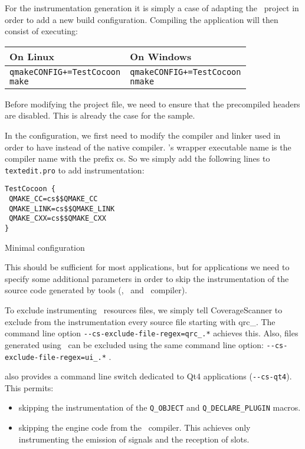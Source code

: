 For the instrumentation generation it is simply a case of adapting the
\qmake\ project in order to add a new build configuration. Compiling the
application will then consist of executing:

\begin{center}
\begin{tabular}{|p{7cm}|p{7cm}|} \hline
  On Linux & On Windows \\\hline
\begin{alltt}
qmake CONFIG+=TestCocoon
make
\end{alltt}
&
\begin{alltt}
qmake CONFIG+=TestCocoon
nmake
\end{alltt} \\ \hline
\end{tabular} 
\end{center} 

Before modifying the project file, we need to ensure that the precompiled
headers are disabled. This is already the case for the {\TextEdit} sample.

In the {\TestCocoon} configuration, we first need to modify the compiler and linker
used in order to have {\CoverageScanner} instead of the native compiler. {\CoverageScanner}'s
wrapper executable name is the compiler name with the prefix cs. So we simply
add the following lines to \texttt{textedit.pro} to add instrumentation:

\begin{figureenv}
\begin{verbatim}
TestCocoon {
 QMAKE_CC=cs$$QMAKE_CC
 QMAKE_LINK=cs$$QMAKE_LINK
 QMAKE_CXX=cs$$QMAKE_CXX
}
\end{verbatim}
\caption{Minimal {\qmake} configuration}
\label{lst:qmake1}
\end{figureenv}

This should be sufficient for most applications, but for {\Qt} applications we need to
specify some additional parameters in order to skip the instrumentation of the
source code generated by {\Qt} tools (\uic, \qrc\ and \moc\ compiler).

To exclude instrumenting \qrc\ resources files, we simply tell CoverageScanner to
exclude from the instrumentation
every source file starting with qrc\_.
The command line option \verb$--cs-exclude-file-regex=qrc_.*$ achieves this.
Also, files generated using \uic\ can be excluded using the same command line
option: \verb$--cs-exclude-file-regex=ui_.*$ .

{\TestCocoon} also provides a command line switch dedicated to Qt4 applications
(\verb$--cs-qt4$). This permits:
\begin{itemize}
  \item skipping the instrumentation of the \verb$Q_OBJECT$ and
    \verb$Q_DECLARE_PLUGIN$ macros.
  \item skipping the engine code from the \moc\ compiler.
    This achieves only instrumenting the emission of signals and the reception
    of slots. 
\end{itemize}

